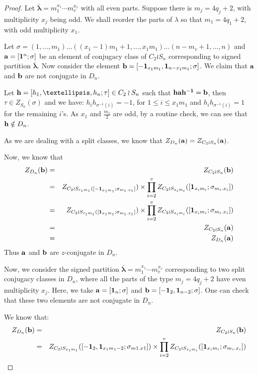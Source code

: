 \documentclass[12pt,twoside,reqno]{amsart}
\theoremstyle{definition}
\numberwithin{equation}{section}
\newcommand{\bmf}[1]{\mathbf{#1}}
\newcommand{\lbd}{\lambda}
\begin{document}
\begin{proof}
 Let $ \bmf{\bar{\lambda}}=m_1^{x_1}\cdots m_v^{x_v}$ with all even parts. Suppose there is $m_j = 4q_j + 2$, with multiplicity $x_j$ being odd. We shall reorder the parts of $\lbd$ so that $m_1 = 4q_1 + 2$, with odd multiplicity $x_1$. 

Let $\sigma = (1, \dots, m_1)\dots((x_1-1)m_1+1,\dots,x_1m_1)\dots(n-m_v+1,\dots,n)$
 and ${\bf a} = [{\bf 1}^n; \sigma]$ be an element of conjugacy class of $C_2 \wr S_n$ corresponding to signed partition $\bmf{\bar{\lambda}}.$
 Now consider the element ${\bf b} = [\bmf{-1}_{x_1m_1},\bmf{1}_{n-x_1m_1}; \sigma]$. We claim that ${\bf a}$ and ${\bf b}$ are not conjugate in $D_n.$ 

 
 Let ${\bf h} = [h_1,\ldots, h_n; \tau] \in C_2\wr S_n$ such that ${\bf hah^{-1}} = {\bf b}$, then $\tau \in Z_{S_n}(\sigma)$ and we have: $h_i h_{\sigma^{-1}(i)} = -1$, for $1 \leq i \leq x_1m_1$ and $h_ih_{\sigma^{-1}(i)} = 1$ for the remaining $i$'s. As $x_1$ and $\frac{m_1}{2}$ are odd, by a routine check, we can see that ${\bf h} \notin D_n$.

 As we are dealing with a split classes, we know that ${Z}_{D_n}({\bf a}) = {Z}_{C_2\wr S_n} ({\bf a})$. 

 Now, we know that 
 \begin{eqnarray*}
{Z}_{D_n}({\bf b}) &=& {Z}_{C_2 \wr S_n}({\bf b}) \\
&=& {Z}_{C_2\wr S_{r_1m_1}([{\bf -1}_{x_1m_1}; \sigma_{m_1.x_1}]}) \times \prod_{i = 2}^v {Z}_{C_2 \wr S_{x_im_i}}
([{\bf 1}_{x_im_i}; \sigma_{m_i.x_i}])\\
&=& {Z}_{C_2\wr S_{r_1m_1}([{\bf 1}_{x_1m_1}; \sigma_{m_1.x_1}]}) \times \prod_{i = 2}^v {Z}_{C_2 \wr S_{x_im_i}}
([{\bf 1}_{x_im_i}; \sigma_{m_i.x_i}])\\
&=& {Z}_{C_2 \wr S_n}({\bf a}) \\
&=& {Z}_{D_n}({\bf a})
\end{eqnarray*}
Thus ${\bf a}$ and ${\bf b}$ are $z$-conjugate in $D_n$.

Now, we consider the signed partition $\bmf{\bar{\lambda}} =m_1^{x_1}\cdots m_v^{x_v}$ corresponding to two split conjugacy classes in $D_n$, where all the parts of the type $m_j = 4q_j + 2$ have even multiplicity $x_j$. Here, we take ${\bf a} = [{\bf 1}_n; \sigma]$ and ${\bf b} = [{\bf -1}_2, {\bf 1}_{n-2}; \sigma]$. One can check that these two elements are not conjugate in $D_n.$

We know that: 
\begin{eqnarray*}
 {Z}_{D_n}({\bf b}) &=& {Z}_{C_2 \wr S_n}({\bf b}) \\
&=&{Z}_{C_2\wr S_{x_1m_1}}([{\bf -1}_2,{\bf 1}_{x_1m_1-2}; \sigma_{m1.x1}]) \times \prod_{i = 2}^v {Z}_{C_2 \wr S_{x_im_i}}([{\bf 1}_{x_im_i}; \sigma_{m_i.x_i}])
\end{eqnarray*}


\end{proof}
\end{document}
